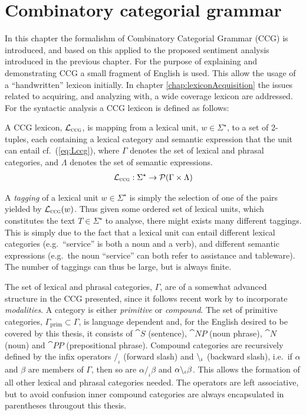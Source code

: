 
\chapter{Combinatory categorial grammar}
\label{chap:ccg}

In this chapter the formalishm of Combinatory Categorial Grammar (CCG) is introduced, and based on this applied to the proposed sentiment analysis introduced in the previous chapter. For the purpose of explaining and demonstrating CCG a small fragment of English is used. This allow the usage of a ``handwritten'' lexicon initially. In chapter \ref{chap:lexiconAcquisition} the issues related to acquiring, and analyzing with, a wide coverage lexicon are addressed. For the syntactic analysis a CCG lexicon is defined as follows:

\begin{definition}
A CCG lexicon, $\mathcal{L}_\textsc{ccg}$, is mapping from a lexical unit, $w \in \Sigma^\star$, to a set of 2-tuples, each containing a lexical category and semantic expression that the unit can entail cf.\ (\ref{eq:Lccg}), where $\Gamma$ denotes the set of lexical and phrasal categories, and $\Lambda$ denotes the set of semantic expressions.
\begin{align}
 \mathcal{L}_\textsc{ccg}: \Sigma^\star \to \mathcal{P}(\Gamma \times \Lambda)
 \label{eq:Lccg}
\end{align}
\done
\vspace{-2em}
\end{definition}

A \emph{tagging} of a lexical unit $w \in \Sigma^\star$ is simply the selection of one of the pairs yielded by $\mathcal{L}_\textsc{ccg}(w)$. Thus given some ordered set of lexical units, which constitutes the text $T \in \Sigma^\star$ to analyse, there might exists many different taggings. This is simply due to the fact that a lexical unit can entail different lexical categories (e.g.\ ``service'' is both a noun and a verb), and different semantic expressions (e.g.\ the noun ``service'' can both refer to assistance and tableware). The number of taggings can thus be large, but is always finite.

The set of lexical and phrasal categories, $\Gamma$, are of a somewhat advanced structure in the CCG presented, since it follows recent work by \citeauthor{multiModalCCG}  to incorporate \emph{modalities}. A category is either \emph{primitive} or \emph{compound}. The set of primitive categories, $\Gamma_\mathrm{prim} \subset \Gamma$, is language dependent and, for the English desired to be covered by this thesis, it consists of $\cat{S}$ (sentence), $\cat{NP}$ (noun phrase), $\cat{N}$ (noun) and $\cat{PP}$ (prepositional phrase). Compound categories are recursively defined by the infix operators $/_\iota$ (forward slash) and $\backslash_\iota$ (backward slash), i.e.\ if $\alpha$ and $\beta$ are members of $\Gamma$, then so are $\alpha/_\iota\beta$ and $\alpha \backslash_\iota \beta$. This allows the formation of all other lexical and phrasal categories needed. The operators are left associative, but to avoid confusion inner compound categories are always encapsulated in parentheses througout this thesis.

